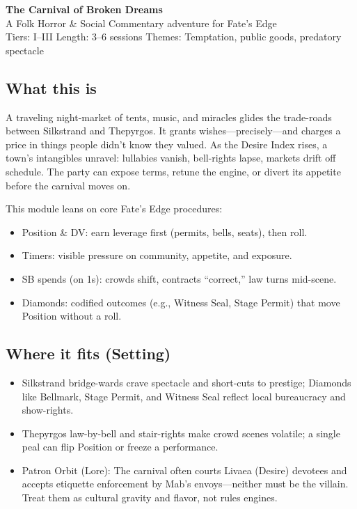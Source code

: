 \documentclass[11pt]{article}
\newcommand{\divider}{\vspace{12pt}\noindent\makebox[\linewidth]{\rule{\textwidth}{0.4pt}}\vspace{12pt}}
\begin{document}



\begin{center}
{\LARGE \textbf{The Carnival of Broken Dreams}} \\
\vspace{6pt}
{\large A Folk Horror \& Social Commentary adventure for Fate's Edge} \\
\vspace{6pt}
{\large Tiers: I--III \textbullet{} Length: 3--6 sessions \textbullet{} Themes: Temptation, public goods, predatory spectacle}
\end{center}

\divider

\subsection*{What this is}

A traveling night-market of tents, music, and miracles glides the trade-roads between Silkstrand and Thepyrgos. It grants wishes---precisely---and charges a price in things people didn't know they valued. As the Desire Index rises, a town's intangibles unravel: lullabies vanish, bell-rights lapse, markets drift off schedule. The party can expose terms, retune the engine, or divert its appetite before the carnival moves on.

This module leans on core Fate's Edge procedures:
\begin{itemize}
\item Position \& DV: earn leverage first (permits, bells, seats), then roll.
\item Timers: visible pressure on community, appetite, and exposure.
\item SB spends (on 1s): crowds shift, contracts ``correct,'' law turns mid-scene.
\item Diamonds: codified outcomes (e.g., Witness Seal, Stage Permit) that move Position without a roll.
\end{itemize}

\divider

\subsection*{Where it fits (Setting)}
\begin{itemize}
\item Silkstrand bridge-wards crave spectacle and short-cuts to prestige; Diamonds like Bellmark, Stage Permit, and Witness Seal reflect local bureaucracy and show-rights.
\item Thepyrgos law-by-bell and stair-rights make crowd scenes volatile; a single peal can flip Position or freeze a performance.
\item Patron Orbit (Lore): The carnival often courts Livaea (Desire) devotees and accepts etiquette enforcement by Mab's envoys---neither must be the villain. Treat them as cultural gravity and flavor, not rules engines.
\end{itemize}
\end{document}
